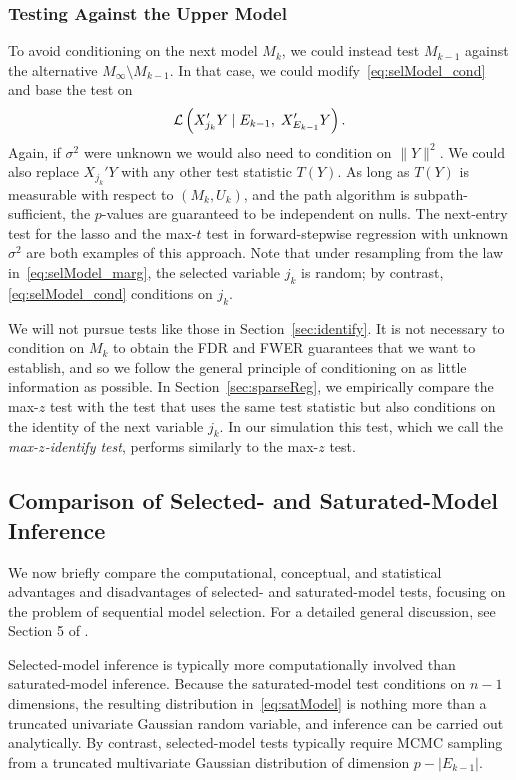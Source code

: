 \documentclass{article}
\begin{document}
\subsubsection{Testing Against the Upper Model}


To avoid conditioning on the next model $M_k$, we could instead test $M_{k-1}$ against the alternative $M_{\infty}\setminus M_{k-1}$. In that case, we could modify~\eqref{eq:selModel_cond} and base the test on
\begin{equation}\label{eq:selModel_marg}
\mathcal{L}\left(X_{j_k}'Y \mid E_{k-1}, \; X_{E_{k-1}}'Y\right).
\end{equation}
Again, if $\sigma^2$ were unknown we would also need to condition on $\|Y\|^2$. We could also replace $X_{j_k}'Y$ with any other test statistic $T(Y)$. As long as $T(Y)$ is measurable with respect to $(M_k, U_k)$, and the path algorithm is subpath-sufficient, the $p$-values are guaranteed to be independent on nulls. The next-entry test for the lasso and the max-$t$ test in forward-stepwise regression with unknown $\sigma^2$ are both examples of this approach. Note that under resampling from the law in~\eqref{eq:selModel_marg}, the selected variable $j_k$ is random; by contrast, \eqref{eq:selModel_cond} conditions on $j_k$.

We will not pursue tests like those in Section~\ref{sec:identify}. It is not necessary to condition on $M_k$ to obtain the FDR and FWER guarantees that we want to establish, and so we follow the general principle of conditioning on as little information as possible. In Section~\ref{sec:sparseReg}, we empirically compare the max-$z$ test with the test that uses the same test statistic but also conditions on the identity of the next variable $j_k$. In our simulation this test, which we call the {\em max-$z$-identify test}, performs similarly to the max-$z$ test.

\subsection{Comparison of Selected- and Saturated-Model Inference}\label{sec:bivariate}

We now briefly compare the computational, conceptual, and statistical advantages and disadvantages of selected- and saturated-model tests, focusing on the problem of sequential model selection. For a detailed general discussion, see Section 5 of \citet{fithian2014optimal}.

Selected-model inference is typically more computationally involved than saturated-model inference. Because the saturated-model test conditions on $n-1$ dimensions, the resulting distribution in~\eqref{eq:satModel} is nothing more than a truncated univariate Gaussian random variable, and inference can be carried out analytically. By contrast, selected-model tests typically require MCMC sampling from a truncated multivariate Gaussian distribution of dimension $p-|E_{k-1}|$.
\end{document}
